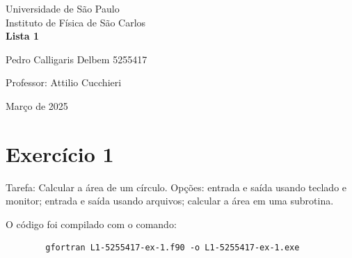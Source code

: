 \documentclass[12pt, a4paper]{article} %
\begin{document}
	
	\begin{titlepage}
		\begin{center}
\Huge{Universidade de São Paulo}\\
\large{Instituto de Física de São Carlos}\\
\vspace{20pt}
\vspace{200pt}
\textbf{Lista 1}\\
\vspace{8cm}
		\end{center}

\begin{flushleft}
\begin{tabbing}
Pedro Calligaris Delbem 5255417\\
\end{tabbing}
\vspace{0.5cm}
Professor: Attilio Cucchieri\\		
		\end{flushleft}
	
		\begin{center}
			\vspace{\fill}
	Março de 2025	
		\end{center}
	\end{titlepage}

	\tableofcontents 
	\thispagestyle{empty}
	\newpage
\section{Exerc\'icio 1}

    Tarefa: Calcular a \'area de um c\'irculo. Op\c{c}\~oes: entrada e sa\'ida usando teclado e monitor; entrada e sa\'ida usando arquivos; calcular a  \'area em uma subrotina.


    O c\'odigo foi compilado com o comando:
    \begin{verbatim}
        gfortran L1-5255417-ex-1.f90 -o L1-5255417-ex-1.exe
    \end{verbatim}
\end{document}
